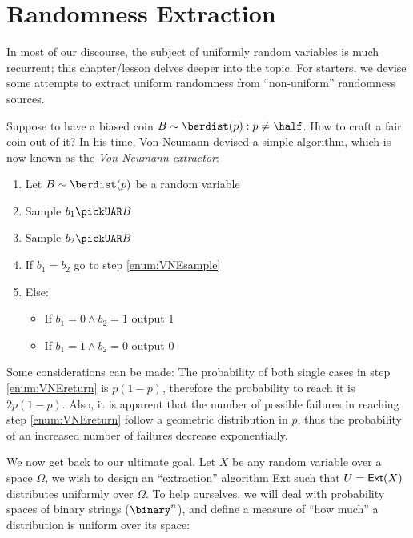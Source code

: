 
\newcommand{\ext}{\textup{\textsf{Ext}}}
\newcommand{\statdist}{\ensuremath{\Delta_\textsc{s}}}
\newcommand{\sdtu}{\ensuremath{\Delta_\textsc{u}}}

\section{Randomness Extraction}

In most of our discourse, the subject of uniformly random variables is much recurrent; this chapter/lesson delves deeper into the topic. For starters, we devise some attempts to extract uniform randomness from ``non-uniform'' randomness sources.

Suppose to have a biased coin $B \sim \berdist(p) : p \neq \half$. How to craft a fair coin out of it? In his time, Von Neumann devised a simple algorithm, which is now known as the \emph{Von Neumann extractor}:

\begin{enumerate}
    \item Let $B \sim \berdist(p)$ be a random variable
    \item \label{enum:VNEsample} Sample $b_1 \pickUAR B$
    \item Sample $b_2 \pickUAR B$
    \item If $b_1 = b_2$ go to step \ref{enum:VNEsample}
    \item \label{enum:VNEreturn} Else:
    \begin{itemize}
        \item If $b_1 = 0 \wedge b_2 = 1$ output 1
        \item If $b_1 = 1 \wedge b_2 = 0$ output 0
    \end{itemize}
\end{enumerate}

Some considerations can be made: The probability of both single cases in step \ref{enum:VNEreturn} is $p(1 - p)$, therefore the probability to reach it is $2p(1 - p)$. Also, it is apparent that the number of possible failures in reaching step \ref{enum:VNEreturn} follow a geometric distribution in $p$, thus the probability of an increased number of failures decrease exponentially.

We now get back to our ultimate goal. Let $X$ be any random variable over a space $\Omega$, we wish to design an ``extraction'' algorithm \ext{} such that $U = \ext(X)$ distributes uniformly over $\Omega$. To help ourselves, we will deal with probability spaces of binary strings ($\binary^n$), and define a measure of ``how much'' a distribution is uniform over its space:

